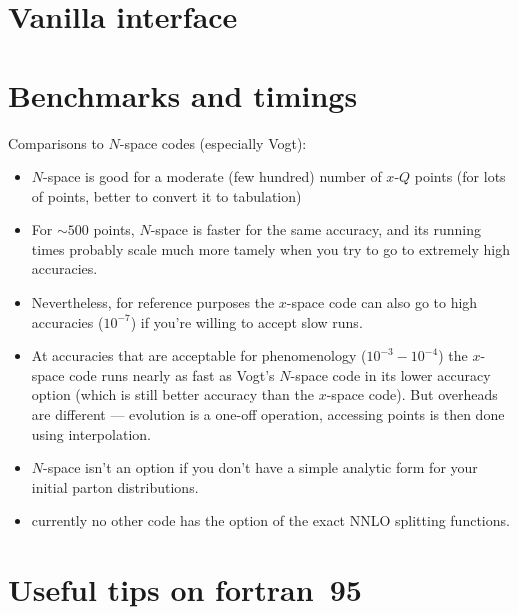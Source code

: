 \documentclass[12pt]{article}
\begin{document}
\section{Vanilla interface}
\label{sec:vanilla}


\section{Benchmarks and timings}
\label{sec:benchmarks}


Comparisons to $N$-space codes (especially Vogt):

\begin{itemize}
\item $N$-space is good for a moderate (few hundred) number of $x$-$Q$
  points (for lots of points, better to convert it to tabulation)
%
\item For $\sim 500$ points, $N$-space is faster for the same
  accuracy, and its running times probably scale much more tamely when
  you try to go to extremely high accuracies.
%
\item Nevertheless, for reference purposes the $x$-space code can also
  go to high accuracies ($10^{-7}$) if you're willing to accept slow
  runs.
%
\item At accuracies that are acceptable for phenomenology ($10^{-3} -
  10^{-4}$) the $x$-space code runs nearly as fast as Vogt's $N$-space
  code in its lower accuracy option (which is still better accuracy
  than the $x$-space code). But overheads are different --- evolution
  is a one-off operation, accessing points is then done using
  interpolation.
%
\item $N$-space isn't an option if you don't have a simple analytic
  form for your initial parton distributions.
%
\item currently no other code has the option of the exact NNLO
  splitting functions.
\end{itemize}

\appendix

\section{Useful tips on fortran~95}
\label{sec:f95appendix}
\end{document}
